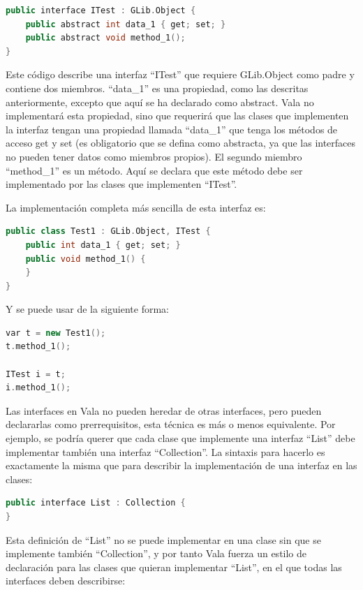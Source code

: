 \documentclass[12pt,twoside]{book}
\begin{document}
\begin{lstlisting}[language=C++]
public interface ITest : GLib.Object {
	public abstract int data_1 { get; set; }
	public abstract void method_1();
}
\end{lstlisting}

Este código describe una interfaz ``ITest'' que requiere GLib.Object como padre y contiene dos miembros. ``data\_1'' es una propiedad, como las descritas anteriormente, excepto que aquí se ha declarado como abstract. Vala no implementará esta propiedad, sino que requerirá que las clases que implementen la interfaz tengan una propiedad llamada ``data\_1'' que tenga los métodos de acceso get y set (es obligatorio que se defina como abstracta, ya que las interfaces no pueden tener datos como miembros propios). El segundo miembro ``method\_1'' es un método. Aquí se declara que este método debe ser implementado por las clases que implementen ``ITest''.

La implementación completa más sencilla de esta interfaz es:

\begin{lstlisting}[language=C++]
public class Test1 : GLib.Object, ITest {
	public int data_1 { get; set; }
	public void method_1() {
	}
}
\end{lstlisting}

Y se puede usar de la siguiente forma:

\begin{lstlisting}[language=C++]
var t = new Test1();
t.method_1();

ITest i = t;
i.method_1();
\end{lstlisting}


Las interfaces en Vala no pueden heredar de otras interfaces, pero pueden declararlas como prerrequisitos, esta técnica es más o menos equivalente. Por ejemplo, se podría querer que cada clase que implemente una interfaz ``List'' debe implementar también una interfaz ``Collection''. La sintaxis para hacerlo es exactamente la misma que para describir la implementación de una interfaz en las clases:

\begin{lstlisting}[language=C++]
public interface List : Collection {
}
\end{lstlisting}


Esta definición de ``List'' no se puede implementar en una clase sin que se implemente también ``Collection'', y por tanto Vala fuerza un estilo de declaración para las clases que quieran implementar ``List'', en el que todas las interfaces deben describirse:
\end{document}

